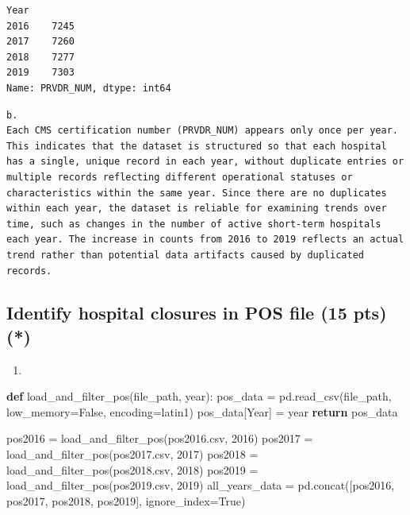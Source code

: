\documentclass[
  letterpaper,
  DIV=11,
  numbers=noendperiod]{scrartcl}
\newenvironment{Shaded}{\begin{snugshade}}{\end{snugshade}}
\newcommand{\ControlFlowTok}[1]{\textcolor[rgb]{0.00,0.23,0.31}{\textbf{#1}}}
\newcommand{\DecValTok}[1]{\textcolor[rgb]{0.68,0.00,0.00}{#1}}
\newcommand{\KeywordTok}[1]{\textcolor[rgb]{0.00,0.23,0.31}{\textbf{#1}}}
\newcommand{\NormalTok}[1]{\textcolor[rgb]{0.00,0.23,0.31}{#1}}
\newcommand{\OperatorTok}[1]{\textcolor[rgb]{0.37,0.37,0.37}{#1}}
\newcommand{\StringTok}[1]{\textcolor[rgb]{0.13,0.47,0.30}{#1}}
\newcommand{\VariableTok}[1]{\textcolor[rgb]{0.07,0.07,0.07}{#1}}
\providecommand{\tightlist}{%
  \setlength{\itemsep}{0pt}\setlength{\parskip}{0pt}}\usepackage{longtable,booktabs,array}
\begin{document}
\begin{verbatim}
Year
2016    7245
2017    7260
2018    7277
2019    7303
Name: PRVDR_NUM, dtype: int64
\end{verbatim}

\begin{verbatim}
b.
Each CMS certification number (PRVDR_NUM) appears only once per year. This indicates that the dataset is structured so that each hospital has a single, unique record in each year, without duplicate entries or multiple records reflecting different operational statuses or characteristics within the same year. Since there are no duplicates within each year, the dataset is reliable for examining trends over time, such as changes in the number of active short-term hospitals each year. The increase in counts from 2016 to 2019 reflects an actual trend rather than potential data artifacts caused by duplicated records.
\end{verbatim}

\subsection{Identify hospital closures in POS file (15 pts)
(*)}\label{identify-hospital-closures-in-pos-file-15-pts}

\begin{enumerate}
\def\labelenumi{\arabic{enumi}.}
\tightlist
\item
\end{enumerate}

\begin{Shaded}
\begin{Highlighting}[]
\KeywordTok{def}\NormalTok{ load\_and\_filter\_pos(file\_path, year):}
\NormalTok{    pos\_data }\OperatorTok{=}\NormalTok{ pd.read\_csv(file\_path, low\_memory}\OperatorTok{=}\VariableTok{False}\NormalTok{, encoding}\OperatorTok{=}\StringTok{\textquotesingle{}latin1\textquotesingle{}}\NormalTok{)}
\NormalTok{    pos\_data[}\StringTok{\textquotesingle{}Year\textquotesingle{}}\NormalTok{] }\OperatorTok{=}\NormalTok{ year}
    \ControlFlowTok{return}\NormalTok{ pos\_data}

\NormalTok{pos2016 }\OperatorTok{=}\NormalTok{ load\_and\_filter\_pos(}\StringTok{\textquotesingle{}pos2016.csv\textquotesingle{}}\NormalTok{, }\DecValTok{2016}\NormalTok{)}
\NormalTok{pos2017 }\OperatorTok{=}\NormalTok{ load\_and\_filter\_pos(}\StringTok{\textquotesingle{}pos2017.csv\textquotesingle{}}\NormalTok{, }\DecValTok{2017}\NormalTok{)}
\NormalTok{pos2018 }\OperatorTok{=}\NormalTok{ load\_and\_filter\_pos(}\StringTok{\textquotesingle{}pos2018.csv\textquotesingle{}}\NormalTok{, }\DecValTok{2018}\NormalTok{)}
\NormalTok{pos2019 }\OperatorTok{=}\NormalTok{ load\_and\_filter\_pos(}\StringTok{\textquotesingle{}pos2019.csv\textquotesingle{}}\NormalTok{, }\DecValTok{2019}\NormalTok{)}
\NormalTok{all\_years\_data }\OperatorTok{=}\NormalTok{ pd.concat([pos2016, pos2017, pos2018, pos2019], ignore\_index}\OperatorTok{=}\VariableTok{True}\NormalTok{)}
\end{Highlighting}
\end{Shaded}
\end{document}
